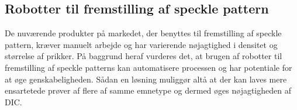 \subsection{Robotter til fremstilling af speckle pattern}  \label{Robotter til fremstilling af speckle pattern}
De nuværende produkter på markedet, der benyttes til fremstilling af speckle pattern, kræver manuelt arbejde og har varierende nøjagtighed i densitet og størrelse af prikker. På baggrund heraf vurderes det, at brugen af robotter til fremstilling af speckle patterns kan automatisere processen og har potentiale for at øge genskabeligheden. Sådan en løsning muliggør altå at der kan laves mere ensartetede prøver af flere af samme emnetype og dermed øges nøjagtigheden af DIC.




